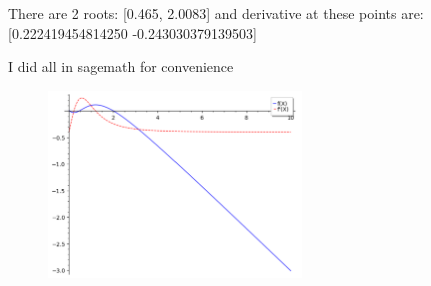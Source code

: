 \documentclass[12pt]{article}
\begin{document}
There are 2 roots: [0.465, 2.0083] and derivative at these points are:
[0.222419454814250 -0.243030379139503]

I did all in sagemath for convenience
\begin{figure}[htbp] %
  \centering
  \includegraphics[width=0.6\textwidth]{hw8_8.png}
\end{figure}
\end{document}
